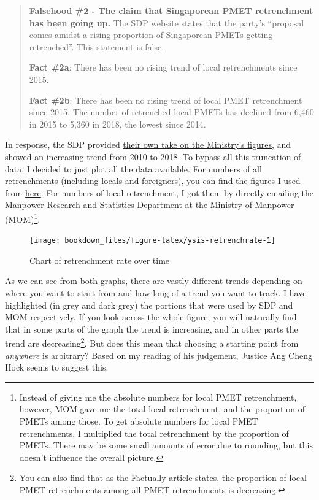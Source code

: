 \documentclass[openany]{book}
\let\rmarkdownfootnote\footnote%
\def\footnote{\protect\rmarkdownfootnote}
\begin{document}
\begin{quote}
\textbf{Falsehood \#2 - The claim that Singaporean PMET retrenchment has
been going up.} The SDP website states that the party's ``proposal comes
amidst a rising proportion of Singaporean PMETs getting retrenched''.
This statement is false.

\textbf{Fact \#2a}: There has been no rising trend of local
retrenchments since 2015.

\textbf{Fact \#2b}: There has been no rising trend of local PMET
retrenchment since 2015. The number of retrenched local PMETs has
declined from 6,460 in 2015 to 5,360 in 2018, the lowest since 2014.
\end{quote}

In response, the SDP provided
\href{https://yoursdp.org/news/sdp-calls-on-josephine-teo-to-retract-correction-directions-and-apologise,-cites-mom's-own-statistics-to-prove-she's-wrong\#site-menu}{their
own take on the Ministry's figures}, and showed an increasing trend from
2010 to 2018. To bypass all this truncation of data, I decided to just
plot all the data available. For numbers of all retrenchments (including
locals and foreigners), you can find the figures I used from
\href{https://stats.mom.gov.sg/Pages/RetrenchmentTimeSeries.aspx}{here}.
For numbers of local retrenchment, I got them by directly emailing the
Manpower Research and Statistics Department at the Ministry of Manpower
(MOM)\footnote{Instead of giving me the absolute numbers for local PMET
  retrenchment, however, MOM gave me the total local retrenchment, and
  the proportion of PMETs among those. To get absolute numbers for local
  PMET retrenchments, I multiplied the total retrenchment by the
  proportion of PMETs. There may be some small amounts of error due to
  rounding, but this doesn't influence the overall picture.}.

\begin{figure}

{\centering \texttt{[image: bookdown\_files/figure-latex/ysis-retrenchrate-1]} 

}

\caption{Chart of retrenchment rate over time}\label{fig:ysis-retrenchrate}
\end{figure}

As we can see from both graphs, there are vastly different trends
depending on where you want to start from and how long of a trend you
want to track. I have highlighted (in grey and dark grey) the portions
that were used by SDP and MOM respectively. If you look across the whole
figure, you will naturally find that in some parts of the graph the
trend is increasing, and in other parts the trend are
decreasing\footnote{You can also find that as the Factually article
  states, the proportion of local PMET retrenchments among all PMET
  retrenchments is decreasing.}. But does this mean that choosing a
starting point from \emph{anywhere} is arbitrary? Based on my reading of
his judgement, Justice Ang Cheng Hock seems to suggest this:
\end{document}
